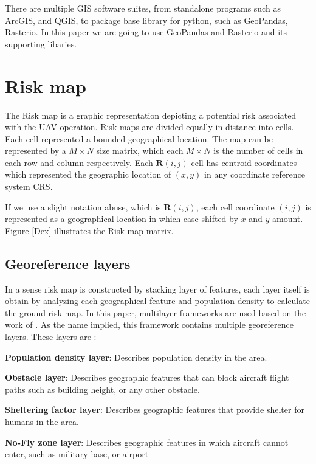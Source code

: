 \documentclass[12pt]{report}
\begin{document}
            There are multiple GIS software suites, from standalone programs such as ArcGIS, and QGIS, to package base
            library for python, such as GeoPandas, Rasterio. In this paper we are going to use GeoPandas and Rasterio
            and its supporting libaries.

    \section{Risk map}
        The Risk map is a graphic representation depicting a potential risk associated with the UAV operation. Risk maps
        are divided equally in distance into cells. Each cell represented a bounded geographical location. The map can
        be represented by a \(M \times N\) size matrix, which each \(M \times N\) is the number of cells in each row and
        column respectively. Each \(\mathbf{R}(i,j)\) cell has centroid coordinates which represented the geographic
        location of \((x, y)\) in any coordinate reference system \ac{CRS}.

        If we use a slight notation abuse, which is \(\mathbf{R}(i,j)\), each cell coordinate \((i, j)\) is represented
        as a geographical location in which case shifted by \(x\) and \(y\) amount. Figure [Dex] illustrates the Risk map
        matrix.

        \subsection{Georeference layers}
            In a sense risk map is constructed by stacking layer of features, each layer itself is obtain by analyzing
            each geographical feature and population density to calculate the ground risk map. In this paper, multilayer
            frameworks are used based on the work of \cite{primatesta_ground_2020}. As the name implied, this framework contains multiple
            georeference layers. These layers are :
                \begin{myitemize}
                    \item \textbf{Population density layer}: Describes population density in the area.
                    \item \textbf{Obstacle layer}: Describes geographic features that can block aircraft flight paths
                    such as building height, or any other obstacle.
                    \item \textbf{Sheltering factor layer}: Describes geographic features that provide shelter for
                    humans in the area.
                    \item \textbf{No-Fly zone layer}: Describes geographic features in which aircraft cannot enter, such
                    as military base, or airport
                \end{myitemize}
\end{document}
